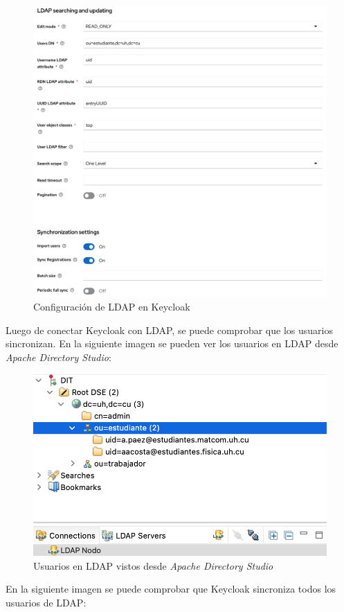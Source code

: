 \begin{enumerate}
		\begin{figure}[H]
		\centering
		\includegraphics[width=0.9\linewidth]{Graphics/keycloak_configuracion_ldap2}
		\caption{Configuración de LDAP en Keycloak}
		\label{fig:keycloakconfiguracionldap1}
	\end{figure}

	Luego de conectar Keycloak con LDAP, se puede comprobar que los usuarios sincronizan. En la siguiente imagen se pueden ver los usuarios en LDAP desde \textit{Apache Directory Studio}:
	
	\begin{figure}[H]
		\centering
		\includegraphics[width=0.7\linewidth]{Graphics/ADS_usuarios}
		\caption{Usuarios en LDAP vistos desde \textit{Apache Directory Studio}}
		\label{fig:adsusuarios}
	\end{figure}

	En la siguiente imagen se puede comprobar que Keycloak sincroniza todos los usuarios de LDAP:
	

\end{enumerate}
